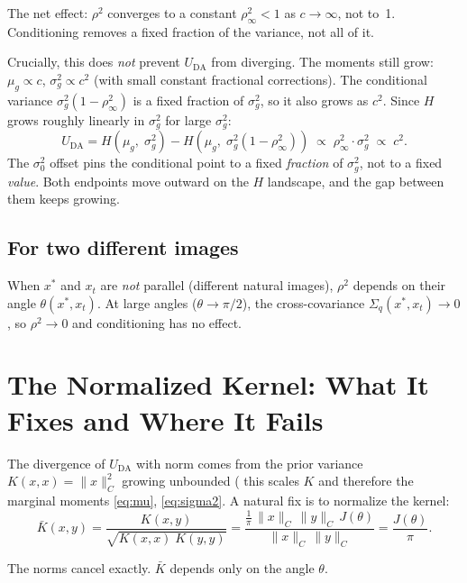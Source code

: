 \documentclass[11pt]{article}
\begin{document}
The net effect: $\rho^2$ converges to a constant $\rho^2_\infty < 1$
as $c \to \infty$, not to~1. Conditioning removes a fixed fraction
of the variance, not all of it.

Crucially, this does \emph{not} prevent $U_{\mathrm{DA}}$ from diverging.
The moments still grow: $\mu_g \propto c$, $\sigma^2_g \propto c^2$
(with small constant fractional corrections). The conditional variance
$\sigma^2_g(1 - \rho^2_\infty)$ is a fixed fraction of $\sigma^2_g$,
so it also grows as $c^2$. Since $H$ grows roughly linearly in
$\sigma^2_g$ for large $\sigma^2_g$:
\[
    U_{\mathrm{DA}}
    = H(\mu_g,\;\sigma^2_g) - H(\mu_g,\;\sigma^2_g(1 - \rho^2_\infty))
    \;\propto\; \rho^2_\infty \cdot \sigma^2_g
    \;\propto\; c^2.
\]
The $\sigma_0^2$ offset pins the conditional point to a fixed
\emph{fraction} of $\sigma^2_g$, not to a fixed \emph{value}.
Both endpoints move outward on the $H$ landscape, and the gap
between them keeps growing.

\subsection*{For two different images}

When $x^*$ and $x_t$ are \emph{not} parallel (different natural images),
$\rho^2$ depends on their angle $\theta(x^*, x_t)$.
At large angles ($\theta \to \pi/2$), the cross-covariance
$\Sigma_q(x^*, x_t) \to 0$, so $\rho^2 \to 0$
and conditioning has no effect.
\section{The Normalized Kernel: What It Fixes and Where It Fails}

The divergence of $U_{\mathrm{DA}}$ with norm comes from the prior
variance $K(x,x) = \|x\|_C^2$ growing unbounded ( this scales $K$ and therefore the marginal moments \ref{eq:mu}, \ref{eq:sigma2}. A natural fix
is to normalize the kernel:
\begin{equation}
    \bar K(x, y) = \frac{K(x, y)}{\sqrt{K(x,x)\;K(y,y)}}
    = \frac{\frac{1}{\pi}\,\|x\|_C\,\|y\|_C\,J(\theta)}
           {\|x\|_C\,\|y\|_C}
    = \frac{J(\theta)}{\pi}.
\end{equation}

The norms cancel exactly. $\bar K$ depends only on the angle $\theta$.
\end{document}
